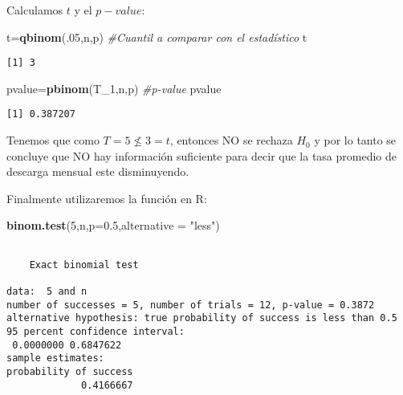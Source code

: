 \documentclass[
  a4paper,
  oneside,
  openany]{book}
\newenvironment{Shaded}{\begin{snugshade}}{\end{snugshade}}
\newcommand{\AttributeTok}[1]{\textcolor[rgb]{0.13,0.29,0.53}{#1}}
\newcommand{\CommentTok}[1]{\textcolor[rgb]{0.56,0.35,0.01}{\textit{#1}}}
\newcommand{\DecValTok}[1]{\textcolor[rgb]{0.00,0.00,0.81}{#1}}
\newcommand{\FloatTok}[1]{\textcolor[rgb]{0.00,0.00,0.81}{#1}}
\newcommand{\FunctionTok}[1]{\textcolor[rgb]{0.13,0.29,0.53}{\textbf{#1}}}
\newcommand{\NormalTok}[1]{#1}
\newcommand{\OtherTok}[1]{\textcolor[rgb]{0.56,0.35,0.01}{#1}}
\newcommand{\StringTok}[1]{\textcolor[rgb]{0.31,0.60,0.02}{#1}}
\begin{document}
Calculamos \(t\) y el \(p-value\):

\begin{Shaded}
\begin{Highlighting}[]
\NormalTok{t}\OtherTok{=}\FunctionTok{qbinom}\NormalTok{(.}\DecValTok{05}\NormalTok{,n,p)       }\CommentTok{\#Cuantil a comparar con el estadístico}
\NormalTok{t}
\end{Highlighting}
\end{Shaded}

\begin{verbatim}
[1] 3
\end{verbatim}

\begin{Shaded}
\begin{Highlighting}[]
\NormalTok{pvalue}\OtherTok{=}\FunctionTok{pbinom}\NormalTok{(T\_1,n,p)  }\CommentTok{\#p{-}value}
\NormalTok{pvalue}
\end{Highlighting}
\end{Shaded}

\begin{verbatim}
[1] 0.387207
\end{verbatim}

Tenemos que como \(T=5\nleq 3 =t\), entonces NO se rechaza \(H_0\) y por lo tanto se concluye que NO hay información suficiente para decir que la tasa promedio de descarga mensual este disminuyendo.

Finalmente utilizaremos la función en R:

\begin{Shaded}
\begin{Highlighting}[]
\FunctionTok{binom.test}\NormalTok{(}\DecValTok{5}\NormalTok{,n,}\AttributeTok{p=}\FloatTok{0.5}\NormalTok{,}\AttributeTok{alternative =} \StringTok{"less"}\NormalTok{)}
\end{Highlighting}
\end{Shaded}

\begin{verbatim}

    Exact binomial test

data:  5 and n
number of successes = 5, number of trials = 12, p-value = 0.3872
alternative hypothesis: true probability of success is less than 0.5
95 percent confidence interval:
 0.0000000 0.6847622
sample estimates:
probability of success 
             0.4166667 
\end{verbatim}
\end{document}
